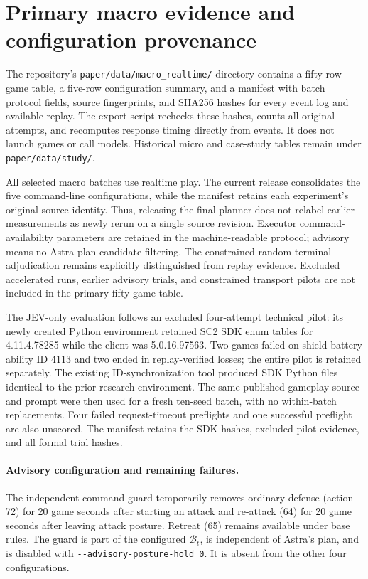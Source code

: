 \documentclass{article}
\begin{document}
\clearpage
\section{Primary macro evidence and configuration provenance}
\label{app:macroprovenance}

The repository's \texttt{paper/data/macro\_realtime/} directory contains a fifty-row game table, a five-row configuration summary, and a manifest with batch protocol fields, source fingerprints, and SHA256 hashes for every event log and available replay. The export script rechecks these hashes, counts all original attempts, and recomputes response timing directly from events. It does not launch games or call models. Historical micro and case-study tables remain under \texttt{paper/data/study/}.

All selected macro batches use realtime play. The current release consolidates the five command-line configurations, while the manifest retains each experiment's original source identity. Thus, releasing the final planner does not relabel earlier measurements as newly rerun on a single source revision. Executor command-availability parameters are retained in the machine-readable protocol; advisory means no Astra-plan candidate filtering. The constrained-random terminal adjudication remains explicitly distinguished from replay evidence. Excluded accelerated runs, earlier advisory trials, and constrained transport pilots are not included in the primary fifty-game table.

The JEV-only evaluation follows an excluded four-attempt technical pilot: its newly created Python environment retained SC2 SDK enum tables for 4.11.4.78285 while the client was 5.0.16.97563. Two games failed on shield-battery ability ID 4113 and two ended in replay-verified losses; the entire pilot is retained separately. The existing ID-synchronization tool produced SDK Python files identical to the prior research environment. The same published gameplay source and prompt were then used for a fresh ten-seed batch, with no within-batch replacements. Four failed request-timeout preflights and one successful preflight are also unscored. The manifest retains the SDK hashes, excluded-pilot evidence, and all formal trial hashes.

\paragraph{Advisory configuration and remaining failures.}
The independent command guard temporarily removes ordinary defense (action 72) for 20 game seconds after starting an attack and re-attack (64) for 20 game seconds after leaving attack posture. Retreat (65) remains available under base rules. The guard is part of the configured $\mathcal{B}_t$, is independent of Astra's plan, and is disabled with \texttt{-{}-advisory-posture-hold 0}. It is absent from the other four configurations.
\end{document}
